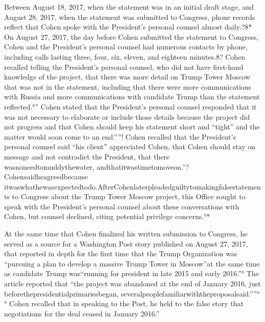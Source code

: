 Between August 18, 2017, when the statement was in an initial draft stage, and August 28, 2017, when the statement was submitted to Congress, phone records reflect that Cohen spoke with the President's personal counsel almost daily.?8* On August 27, 2017, the day before Cohen submitted the statement to Congress, Cohen and the President's personal counsel had numerous contacts by phone, including calls lasting three, four, six, eleven, and eighteen minutes.8? Cohen recalled telling the President's personal counsel, who did not have first-hand knowledge of the project, that there was more detail on Trump Tower Moscow that was not in the statement, including that there were more communications with Russia and more communications with candidate Trump than the statement reflected.°” Cohen stated that the President's personal counsel responded that it was not necessary to elaborate or include those details because the project did not progress and that Cohen should keep his statement short and “tight” and the matter would soon come to an end.””! Cohen recalled that the President's personal counsel said “his client” appreciated Cohen, that Cohen should stay on message and not contradict the President, that there wasnoneedtomuddythewater, andthatitwastimetomoveon.”? Cohensaidheagreedbecause itwaswhathewasexpectedtodo.AfterCohenlaterpleadedguiltytomakingfalsestatements to Congress about the Trump Tower Moscow project, this Office sought to speak with the President's personal counsel about these conversations with Cohen, but counsel declined, citing potential privilege concerns.°*

At the same time that Cohen finalized his written submission to Congress, he served as a source for a Washington Post story published on August 27, 2017, that reported in depth for the first time that the Trump Organization was “pursuing a plan to develop a massive Trump Tower in Moscow”at the same time as candidate Trump was“running for president in late 2015 and early 2016.”° The article reported that “the project was abandoned at the end of January 2016, just beforethepresidentialprimariesbegan, severalpeoplefamiliarwiththeproposalsaid.””°° Cohen recalled that in speaking to the Post, he held to the false story that negotiations for the deal ceased in January 2016.”

